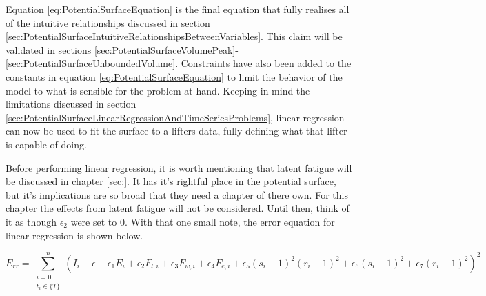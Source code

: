 %
%
%
%

Equation \ref{eq:PotentialSurfaceEquation} is the final equation that fully realises all of the intuitive relationships discussed in section \ref{sec:PotentialSurfaceIntuitiveRelationshipsBetweenVariables}. This claim will be validated in sections \ref{sec:PotentialSurfaceVolumePeak}-\ref{sec:PotentialSurfaceUnboundedVolume}. Constraints have also been added to the constants in equation \ref{eq:PotentialSurfaceEquation} to limit the behavior of the model to what is sensible for the problem at hand. Keeping in mind the limitations discussed in section \ref{sec:PotentialSurfaceLinearRegressionAndTimeSeriesProblems}, linear regression can now be used to fit the surface to a lifters data, fully defining what that lifter is capable of doing. 

Before performing linear regression, it is worth mentioning that latent fatigue will be discussed in chapter \ref{sec:}. It has it's rightful place in the potential surface, but it's implications are so broad that they need a chapter of there own. For this chapter the effects from latent fatigue will not be considered. Until then, think of it as though $\epsilon_2$ were set to $0$.  With that one small note, the error equation for linear regression is shown below.

\begin{equation*}
    E_{rr}=\sum_{
            \substack{i=0\\ t_i\in \{ T \}}
        }^n \left(
        I_i
        -\epsilon
        -\epsilon_1 E_i
        +\epsilon_2 F_{l,i}
        +\epsilon_3 F_{w,i}
        +\epsilon_4 F_{e,i}
        +\epsilon_5 (s_i-1)^2(r_i-1)^2
        +\epsilon_6 (s_i-1)^2
        +\epsilon_7 (r_i-1)^2
    \right)^2
\end{equation*}

